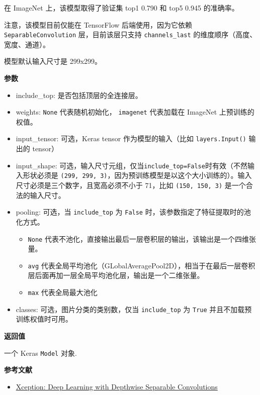 在 ImageNet 上，该模型取得了验证集 top1 0.790 和 top5 0.945 的准确率。

注意，该模型目前仅能在 TensorFlow 后端使用，因为它依赖
\texttt{SeparableConvolution} 层，目前该层只支持 \texttt{channels\_last}
的维度顺序（高度、宽度、通道）。

模型默认输入尺寸是 299x299。

\textbf{参数}

\begin{itemize}
\tightlist
\item
  include\_top: 是否包括顶层的全连接层。
\item
  weights: \texttt{None} 代表随机初始化，
  \texttt{\textquotesingle{}imagenet\textquotesingle{}} 代表加载在
  ImageNet 上预训练的权值。
\item
  input\_tensor: 可选，Keras tensor 作为模型的输入（比如
  \texttt{layers.Input()} 输出的 tensor）
\item
  input\_shape:
  可选，输入尺寸元组，仅当\texttt{include\_top=False}时有效（不然输入形状必须是
  \texttt{(299,\ 299,\ 3)}，因为预训练模型是以这个大小训练的）。输入尺寸必须是三个数字，且宽高必须不小于
  71，比如 \texttt{(150,\ 150,\ 3)} 是一个合法的输入尺寸。
\item
  pooling: 可选，当 \texttt{include\_top} 为 \texttt{False}
  时，该参数指定了特征提取时的池化方式。

  \begin{itemize}
  \tightlist
  \item
    \texttt{None}
    代表不池化，直接输出最后一层卷积层的输出，该输出是一个四维张量。
  \item
    \texttt{\textquotesingle{}avg\textquotesingle{}}
    代表全局平均池化（GLobalAveragePool2D），相当于在最后一层卷积层后面再加一层全局平均池化层，输出是一个二维张量。
  \item
    \texttt{\textquotesingle{}max\textquotesingle{}} 代表全局最大池化
  \end{itemize}
\item
  classes: 可选，图片分类的类别数，仅当 \texttt{include\_top} 为
  \texttt{True} 并且不加载预训练权值时可用。
\end{itemize}

\textbf{返回值}

一个 Keras \texttt{Model} 对象.

\textbf{参考文献}\label{ux53c2ux8003ux6587ux732e}

\begin{itemize}
\tightlist
\item
  \href{https://arxiv.org/abs/1610.02357}{Xception: Deep Learning with
  Depthwise Separable Convolutions}
\end{itemize}

